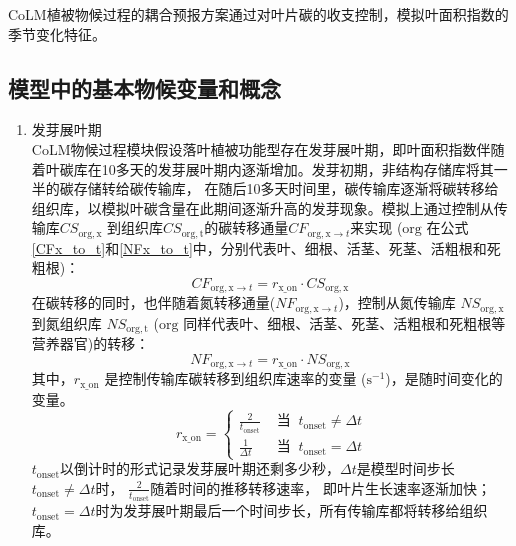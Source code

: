CoLM植被物候过程的耦合预报方案通过对叶片碳的收支控制，模拟叶面积指数的季节变化特征。


\subsection{模型中的基本物候变量和概念}\label{模型中的基本物候变量和概念}

\begin{enumerate}
    \renewcommand{\theenumi}{\alph{enumi}}
  \item 发芽展叶期\\
    CoLM物候过程模块假设落叶植被功能型存在发芽展叶期，即叶面积指数伴随着叶碳库在10多天的发芽展叶期内逐渐增加。发芽初期，非结构存储库将其一半的碳存储转给碳传输库，
    在随后10多天时间里，碳传输库逐渐将碳转移给组织库，以模拟叶碳含量在此期间逐渐升高的发芽现象。模拟上通过控制从传输库$CS_{\mathrm{org,{x}}}$
    到组织库$CS_{\mathrm{org,t}}$的碳转移通量$CF_{\mathrm{org,{x}}\rightarrow {t}}$来实现
    (${\mathrm {org}}$ 在公式\eqref{CFx_to_t}和\eqref{NFx_to_t}中，分别代表叶、细根、活茎、死茎、活粗根和死粗根)：
    \begin{equation}\label{CFx_to_t}
      CF_{\mathrm{org,{x}}\rightarrow t} = r_{\mathrm{{x}}\_{\mathrm{on}}}\cdot CS_{\mathrm{org,{x}}}\
    \end{equation}
    在碳转移的同时，也伴随着氮转移通量($NF_{\mathrm{org,{x}}\rightarrow t}$)，控制从氮传输库 $NS_{\mathrm{org,{x}}}$ 到氮组织库 $NS_{\mathrm{org,t}}$ (${\mathrm {org}}$ 同样代表叶、细根、活茎、死茎、活粗根和死粗根等营养器官)的转移：
    \begin{equation}\label{NFx_to_t}
      NF_{\mathrm{org,{x}}\rightarrow t} = r_{\mathrm{{x}}\_{\mathrm{on}}}\cdot NS_{\mathrm{org,{x}}}\
    \end{equation}
    其中，$r_{\mathrm{{x}}\_{\mathrm{on}}}$ 是控制传输库碳转移到组织库速率的变量 ($\mathrm{s^{-1}}$)，是随时间变化的变量。
    \begin{equation}
      r_{\mathrm{x\_{on}}}=\begin{cases}
        \frac{2}{t_{\mathrm{ {onset}}}} &  \text{ 当 }\ t_{\mathrm{ {onset}}} \neq \Delta t \\
        \frac{1}{\Delta t} &  \text{ 当 }\ t_{\mathrm{onset}}=\Delta t
      \end{cases}
    \end{equation}
    $t_{\mathrm{onset}}$以倒计时的形式记录发芽展叶期还剩多少秒，$\Delta t$是模型时间步长$t_{\mathrm{onset}}\neq\Delta t$时，
    $\frac{2}{t_{\mathrm{onset}}}$随着时间的推移转移速率，
    即叶片生长速率逐渐加快；$t_{\mathrm{onset}}=\Delta t$时为发芽展叶期最后一个时间步长，所有传输库都将转移给组织库。


\end{enumerate}
